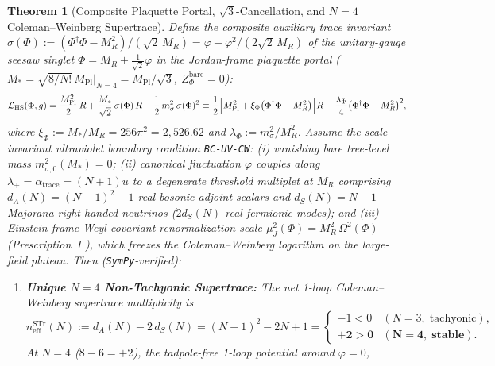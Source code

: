 \documentclass[11pt,a4paper]{article}
\newtheorem{theorem}{Theorem}[section]
\begin{document}
\begin{theorem}[Composite Plaquette Portal, \texorpdfstring{$\sqrt{3}$}{sqrt(3)}-Cancellation, and \texorpdfstring{$N = 4$}{N = 4} Coleman--Weinberg Supertrace]
\label{thm:scalaron-derivation}
Define the composite auxiliary trace invariant $\sigma(\Phi) := (\Phi^\dagger\Phi - M_R^2)/(\sqrt{2}\,M_R) = \varphi + \varphi^2/(2\sqrt{2}\,M_R)$ of the unitary-gauge seesaw singlet $\Phi = M_R + \frac{1}{\sqrt{2}}\varphi$ in the Jordan-frame plaquette portal ($M_* = \sqrt{8/N!}\,M_{\mathrm{Pl}}\big|_{N=4} = M_{\mathrm{Pl}}/\sqrt{3}$, $Z_\Phi^{\mathrm{bare}} = 0$):
\begin{equation}
\mathcal{L}_{\mathrm{HS}}(\Phi, g) = \frac{M_{\mathrm{Pl}}^2}{2}\,R + \frac{M_*}{\sqrt{2}}\,\sigma(\Phi)\,R - \frac{1}{2}\,m_\sigma^2\,\sigma(\Phi)^2 \equiv \frac{1}{2}\Bigl[M_{\mathrm{Pl}}^2 + \xi_\Phi\bigl(\Phi^\dagger\Phi - M_R^2\bigr)\Bigr]R - \frac{\lambda_\Phi}{4}\bigl(\Phi^\dagger\Phi - M_R^2\bigr)^2,
\label{eq:hs-portal}
\end{equation}
where $\xi_\Phi := M_*/M_R = 256\pi^2 = 2{,}526.62$ and $\lambda_\Phi := m_\sigma^2 / M_R^2$. Assume the scale-invariant ultraviolet boundary condition \texttt{BC-UV-CW}: (i) vanishing bare tree-level mass $m_{\sigma,0}^2(M_*) = 0$; (ii) canonical fluctuation $\varphi$ couples along $\lambda_+ = \alpha_{\mathrm{trace}} = (N+1)u$ to a degenerate threshold multiplet at $M_R$ comprising $d_A(N) = (N-1)^2 - 1$ real bosonic adjoint scalars and $d_S(N) = N - 1$ Majorana right-handed neutrinos ($2d_S(N)$ real fermionic modes); and (iii) Einstein-frame Weyl-covariant renormalization scale $\mu_J^2(\Phi) = M_R^2\,\Omega^2(\Phi)$ (\emph{Prescription~I} \cite{ShaposhnikovZenhausern2009}), which freezes the Coleman--Weinberg logarithm on the large-field plateau. Then (\texttt{SymPy}-verified):
\begin{enumerate}[label=(\alph*),leftmargin=1.8em,itemsep=3pt]
\item \textbf{Unique $N = 4$ Non-Tachyonic Supertrace:} The net 1-loop Coleman--Weinberg supertrace multiplicity \cite{ColemanWeinberg1973,GildenerWeinberg1976} is
\begin{equation}
n_{\mathrm{eff}}^{\mathrm{STr}}(N) := d_A(N) - 2\,d_S(N) = (N-1)^2 - 2N + 1 = \begin{cases} -1 < 0 & (N = 3,\;\text{tachyonic}), \\ \mathbf{+2 > 0} & (\mathbf{N = 4,\;\text{stable}}). \end{cases}
\label{eq:supertrace}
\end{equation}
At $N = 4$ ($8 - 6 = +2$), the tadpole-free 1-loop potential around $\varphi = 0$,

\end{enumerate}
\end{theorem}
\end{document}
